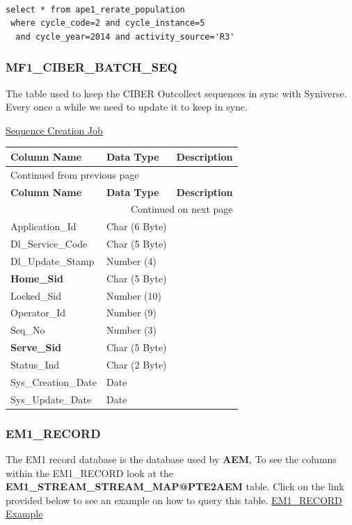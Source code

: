 \documentclass[12pt,twoside]{article}
\begin{document}
\begin{verbatim}

select * from ape1_rerate_population 
 where cycle_code=2 and cycle_instance=5 
  and cycle_year=2014 and activity_source='R3'
\end{verbatim}

\subsubsection{MF1\_CIBER\_BATCH\_SEQ}
\label{sec:orgheadline78}
The table used to keep the CIBER Outcollect sequences in sync
with Syniverse. Every once a while we need to update it to keep
in sync.

\href{file:///home/dbalchen/workspace/Outcollects/updateSeq.pl}{Sequence Creation Job}

\footnotesize

\begin{longtable}{l|l|l}
\hline
\textbf{Column Name} & \textbf{Data Type} & \textbf{Description}\\
\hline
\endfirsthead
\multicolumn{3}{l}{Continued from previous page} \\
\hline

\textbf{Column Name} & \textbf{Data Type} & \textbf{Description} \\

\hline
\endhead
\hline\multicolumn{3}{r}{Continued on next page} \\
\endfoot
\endlastfoot
\hline
Application\_Id & Char (6 Byte) & \\
Dl\_Service\_Code & Char (5 Byte) & \\
Dl\_Update\_Stamp & Number (4) & \\
\textbf{Home\_Sid} & Char (5 Byte) & \\
Locked\_Sid & Number (10) & \\
Operator\_Id & Number (9) & \\
Seq\_No & Number (3) & \\
\textbf{Serve\_Sid} & Char (5 Byte) & \\
Status\_Ind & Char (2 Byte) & \\
Sys\_Creation\_Date & Date & \\
Sys\_Update\_Date & Date & \\
\hline
\end{longtable}
\normalsize

\subsubsection{EM1\_RECORD}
\label{sec:orgheadline79}
The EM1 record database is the database used by \textbf{AEM}, To see the columns within the EM1\_RECORD look at the \textbf{EM1\_STREAM\_STREAM\_MAP@PTE2AEM} table.
Click on the link provided below to see an example on how to query this table.
     \href{file:///home/dbalchen/workspace/CommonPlace/docs/em1_example.sql}{EM1\_RECORD Example}
\end{document}
